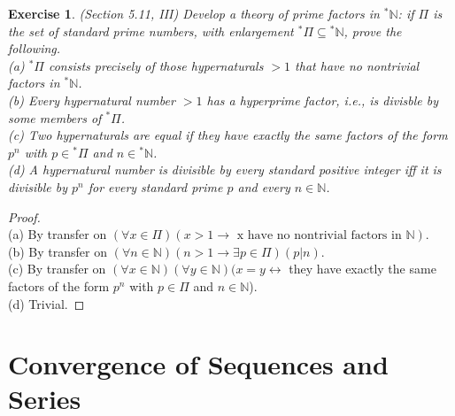 \documentclass[a4paper, 11pt, openany]{book}
\theoremstyle{plain}
\newtheorem{exercise}{Exercise}[chapter]
\theoremstyle{plain}
\newcommand{\N}{\mathbb{N}}
\newcommand{\hyp}{{}^*}
\begin{document}
  \begin{exercise}
    (Section 5.11, III)
    Develop a theory of prime factors in $\hyp \N$: if $\Pi$ is the set of standard prime numbers, with enlargement $\hyp \Pi \subseteq \hyp \N$, prove the following. \\
    (a) $\hyp \Pi$ consists precisely of those hypernaturals $>1$ that have no nontrivial factors in $\hyp \N$. \\
    (b) Every hypernatural number $>1$ has a hyperprime factor, i.e., is divisble by some members of $\hyp \Pi$. \\
    (c) Two hypernaturals are equal if they have exactly the same factors of the form $p^n$ with $p \in \hyp \Pi$ and $n \in \hyp \N$. \\
    (d) A hypernatural number is divisible by every standard positive integer iff it is divisible by $p^n$ for every standard prime $p$ and every $n \in \N$.
  \end{exercise}
  \begin{proof} $ $ \\
    (a) By transfer on $(\forall x \in \Pi) (x>1 \rightarrow \text{ x have no nontrivial factors in } \N)$. \\
    (b) By transfer on $(\forall n \in \N)(n>1 \rightarrow \exists p \in \Pi)(p|n)$.  \\
    (c) By transfer on $(\forall x \in \N)(\forall y \in \N)(x=y \leftrightarrow$ they have exactly the same factors of the form $p^n$ with $p \in \Pi$ and $n \in \N$). \\
    (d) Trivial.
  \end{proof}

\chapter{Convergence of Sequences and Series}
\end{document}
